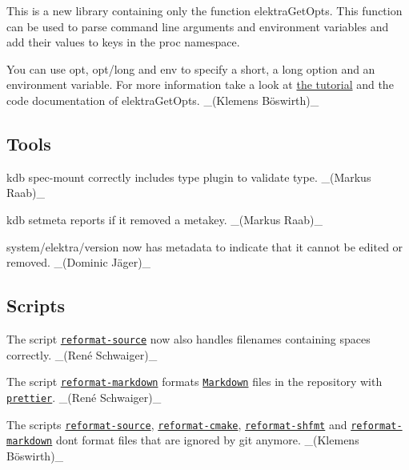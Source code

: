 \begin{DoxyItemize}
\item This is a new library containing only the function {\ttfamily elektra\+Get\+Opts}. This function can be used to parse command line arguments and environment variables and add their values to keys in the proc namespace.

You can use {\ttfamily opt}, {\ttfamily opt/long} and {\ttfamily env} to specify a short, a long option and an environment variable. For more information take a look at \hyperlink{doc_tutorials_command-line-options_md}{the tutorial} and the code documentation of {\ttfamily elektra\+Get\+Opts}. \+\_\+(Klemens Böswirth)\+\_\+
\end{DoxyItemize}

\subsection*{Tools}


\begin{DoxyItemize}
\item {\ttfamily kdb spec-\/mount} correctly includes type plugin to validate {\ttfamily type}. \+\_\+(\+Markus Raab)\+\_\+
\item {\ttfamily kdb setmeta} reports if it removed a metakey. \+\_\+(\+Markus Raab)\+\_\+
\item {\ttfamily system/elektra/version} now has metadata to indicate that it cannot be edited or removed. \+\_\+(Dominic Jäger)\+\_\+
\end{DoxyItemize}

\subsection*{Scripts}


\begin{DoxyItemize}
\item The script \href{https://master.libelektra.org/scripts/reformat-source}{\tt {\ttfamily reformat-\/source}} now also handles filenames containing spaces correctly. \+\_\+(René Schwaiger)\+\_\+
\item The script \href{https://master.libelektra.org/scripts/reformat-markdown}{\tt {\ttfamily reformat-\/markdown}} formats \href{https://daringfireball.net/projects/markdown}{\tt Markdown} files in the repository with \href{https://prettier.io}{\tt {\ttfamily prettier}}. \+\_\+(René Schwaiger)\+\_\+
\item The scripts \href{https://master.libelektra.org/scripts/reformat-source}{\tt {\ttfamily reformat-\/source}}, \href{https://master.libelektra.org/scripts/reformat-cmake}{\tt {\ttfamily reformat-\/cmake}}, \href{https://master.libelektra.org/scripts/reformat-shfmt}{\tt {\ttfamily reformat-\/shfmt}} and \href{https://master.libelektra.org/scripts/reformat-markdown}{\tt {\ttfamily reformat-\/markdown}} don\textquotesingle{}t format files that are ignored by git anymore. \+\_\+(Klemens Böswirth)\+\_\+
\end{DoxyItemize}

